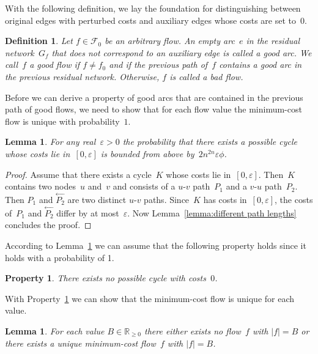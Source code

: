 \documentclass[11pt]{article}
\newtheorem{lemma}[theorem]{Lemma}
\newtheorem{definition}[theorem]{Definition}
\newtheorem{property}[theorem]{Property}
\newcommand{\RR}{\mathbb{R}}
\newcommand{\F}{\mathcal{F}}
\newcommand{\e}{\varepsilon}
\begin{document}
With the following definition, we lay the foundation for distinguishing between original edges with perturbed costs and auxiliary edges whose costs are set to~$0$.

\begin{definition}
Let $f \in \F_0$ be an arbitrary flow. An empty arc~$e$ in the residual network~$G_f$ that does not correspond to an auxiliary edge is called a \emph{good arc}. We call~$f$ a \emph{good flow} if $f \neq f_0$ and if the previous path of~$f$ contains a good arc in the previous residual network. Otherwise, $f$ is called a \emph{bad flow}.
\end{definition}

Before we can derive a property of good arcs that are contained in the previous path of good flows, we need to show that for each flow value the minimum-cost flow is unique with probability~$1$.

\begin{lemma}
\label{lemma:non zero cycle lengths}
For any real~$\e > 0$ the probability that there exists a possible cycle whose costs lie in~$[0,\e]$ is bounded from above by~$2n^{2n} \e \phi$.
\end{lemma}

\begin{proof}
Assume that there exists a cycle~$K$ whose costs lie in~$[0,\e]$. Then~$K$ contains two nodes~$u$ and~$v$ and consists of a $u$-$v$ path~$P_1$ and a $v$-$u$ path~$P_2$.
Then $P_1$ and $\stackrel{\leftarrow}{P_2}$ are two distinct $u$-$v$ paths. Since~$K$ has costs in~$[0,\e]$, the costs of~$P_1$ and $\stackrel{\leftarrow}{P_2}$ differ by at most~$\e$.
Now Lemma~\ref{lemma:different path lengths} concludes the proof.
\end{proof}

According to Lemma~\ref{lemma:non zero cycle lengths} we can assume that the following property holds since it holds with a probability of 1.

\begin{property}
\label{property:non zero cycle lengths}
There exists no possible cycle with costs~$0$.
\end{property}

With Property~\ref{property:non zero cycle lengths} we can show that the minimum-cost flow is unique for each value.

\begin{lemma}
\label{lemma:unique minimum cost flow}
For each value $B \in \RR_{\geq 0}$ there either exists no flow~$f$ with $|f| = B$ or there exists a unique minimum-cost flow~$f$ with $|f| = B$.
\end{lemma}
\end{document}
